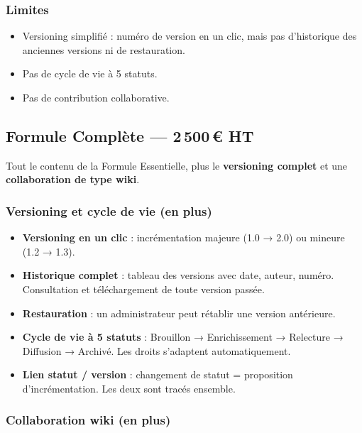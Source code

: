 \documentclass[a4paper,12pt,french]{article}
\begin{document}
\subsubsection{Limites}

\begin{itemize}[leftmargin=1.5em]
  \item Versioning simplifié : numéro de version en un clic, mais pas d'historique des anciennes versions ni de restauration.
  \item Pas de cycle de vie à 5 statuts.
  \item Pas de contribution collaborative.
\end{itemize}


\subsection{Formule Complète — 2\,500\,€ HT}

Tout le contenu de la Formule Essentielle, plus le \textbf{versioning complet} et une \textbf{collaboration de type wiki}.

\subsubsection{Versioning et cycle de vie (en plus)}

\begin{itemize}[leftmargin=1.5em]
  \item \textbf{Versioning en un clic} : incrémentation majeure (1.0 → 2.0) ou mineure (1.2 → 1.3).
  \item \textbf{Historique complet} : tableau des versions avec date, auteur, numéro. Consultation et téléchargement de toute version passée.
  \item \textbf{Restauration} : un administrateur peut rétablir une version antérieure.
  \item \textbf{Cycle de vie à 5 statuts} : Brouillon → Enrichissement → Relecture → Diffusion → Archivé. Les droits s'adaptent automatiquement.
  \item \textbf{Lien statut / version} : changement de statut = proposition d'incrémentation. Les deux sont tracés ensemble.
\end{itemize}

\subsubsection{Collaboration wiki (en plus)}
\end{document}
